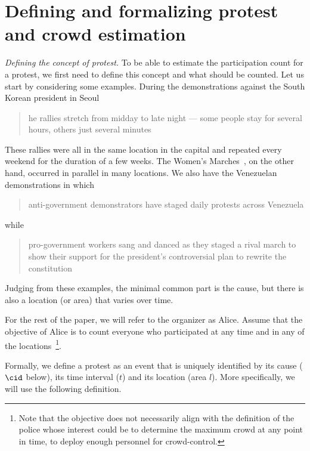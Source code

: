 \section{Defining and formalizing protest and crowd estimation}%
\label{SystemModel}


\emph{Defining the concept of protest.} To be able to estimate the participation count for a protest, we first need to define this concept and what should be counted.
Let us start by considering some examples.
During the demonstrations against the South Korean president in Seoul
\blockcquote{2016DemonstrationsInSeoul}{%
  he rallies stretch from midday to late night --- some people stay for several hours, others just several minutes%
}.
These rallies were all in the same location in the capital and repeated every 
weekend for the duration of a few weeks.
The Women's Marches~\cite{2017WomensMarchesInUS}, on the other hand, occurred in parallel in many locations.
We also have the Venezuelan demonstrations in which
\blockcquote{2017VenezuelaProtestFrequency}{%
  anti-government demonstrators have staged daily protests across Venezuela%
} while
\blockcquote{AlJazeeraOnVenezuela2017}{%
  pro-government workers sang and danced as they staged a rival march to show their support for the president's controversial plan to rewrite the constitution%
}.
Judging from these examples, the minimal common part is the cause,%
\label{CauseIsTheCommonDenominator} but there is also a location (or area) that varies over time.

For the rest of the paper, we will refer to the organizer as Alice.
Assume that the objective of Alice is to count everyone who participated at any time and in any of the locations~\cite{2016DemonstrationsInSeoul}\footnote{Note that the objective does not necessarily align with the definition of the police whose interest could be to determine the maximum crowd at any point in time, to deploy enough personnel for crowd-control.}.


Formally, we define a protest as an event that is uniquely identified by its 
cause (\(\cid\) below), its time interval (\(t\)) and its location (area \(l\)).
More specifically, we will use the following definition.

